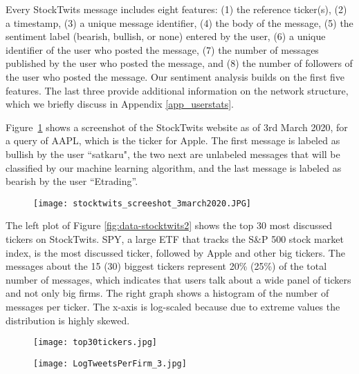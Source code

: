 Every StockTwits message includes eight features: (1) the reference ticker(s), (2) a timestamp, (3) a unique message identifier, (4) the body of the message, (5) the sentiment label (bearish, bullish, or none) entered by the user, (6) a unique identifier of the user who posted the message, (7) the number of messages published by the user who posted the message, and (8) the number of followers of the user who posted the message. Our sentiment analysis builds on the first five features. The last three provide additional information on the network structure, which we briefly discuss in Appendix \ref{app_userstats}.

Figure~\ref{screenshot} shows a screenshot of the StockTwits website as of 3rd March 2020, for a query of AAPL, which is the ticker for Apple. The first message is labeled as bullish by the user ``satkaru", the two next are unlabeled messages that will be classified by our machine learning algorithm, and the last message is labeled as bearish by the user ``Etrading''. 

\begin{figure}[h]
\centering
\texttt{[image: stocktwits\_screeshot\_3march2020.JPG]}
\label{screenshot}
\end{figure}


The left plot of Figure \ref{fig:data-stocktwits2} shows the top 30 most discussed tickers on StockTwits. SPY, a large ETF that tracks the S\&P 500 stock market index, is the most discussed ticker, followed by Apple and other big tickers. The messages about the 15 (30) biggest tickers represent 20\% (25\%) of the total number of messages, which indicates that users talk about a wide panel of tickers and not only big firms. The right graph shows a histogram of the number of messages per ticker. The x-axis is log-scaled because due to extreme values the distribution is highly skewed. 

\begin{figure*}[h]
\centering
\begin{subfigure}{0.49\textwidth}  
            \centering 
            \texttt{[image: top30tickers.jpg]}
        \end{subfigure}
        \begin{subfigure}{0.49\textwidth}   
            \centering 
            \texttt{[image: LogTweetsPerFirm\_3.jpg]}
        \end{subfigure}
        \label{fig:data-stocktwits2}
\end{figure*}


